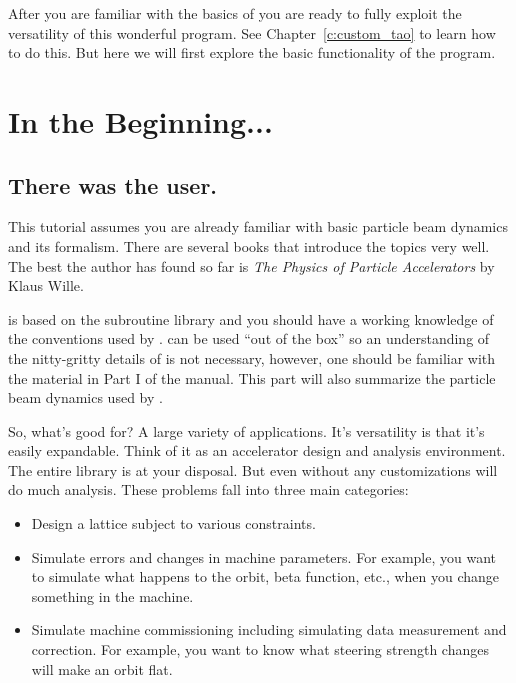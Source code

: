 After you are familiar with the basics of \tao you are ready to fully
exploit the versatility of this wonderful program. See
Chapter~\ref{c:custom_tao} to learn how to do this. But here we will
first explore the basic functionality of the program.

\section{In the Beginning...}
\label{s:beginning}

\subsection{There was the user.}

This tutorial assumes you are already familiar with basic particle
beam dynamics and its formalism. There are several books that
introduce the topics very well. The best the author has found so far
is \textit{The Physics of Particle Accelerators} by Klaus Wille.

\tao is based on the \bmad subroutine library and you should have a
working knowledge of the conventions used by \bmad. \tao can be used
``out of the box'' so an understanding of the nitty-gritty details of
\bmad is not necessary, however, one should be familiar with the
material in Part I of the \bmad manual. This part will also summarize
the particle beam dynamics used by \tao.

So, what's \tao good for? A large variety of applications. It's
versatility is that it's easily expandable. Think of it as an
accelerator design and analysis environment. The entire \bmad library
is at your disposal. But even without any customizations \tao will do
much analysis. These problems fall into three main categories:

\begin{itemize}
\item 
Design a lattice subject to various constraints.
\item
Simulate errors and changes in machine parameters. For example, you want to
simulate what happens to the orbit, beta function, etc., when you change
something in the machine. 
\item 
Simulate machine commissioning including simulating data measurement and
correction. For example, you want to know what steering strength changes will
make an orbit flat.
\end{itemize}

